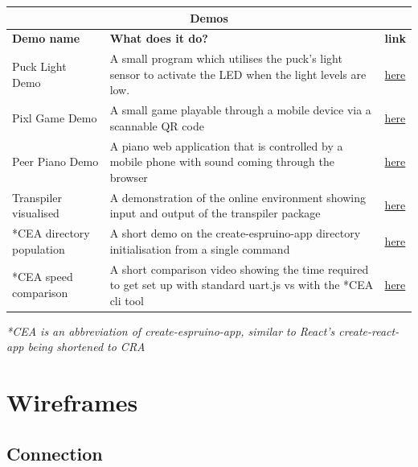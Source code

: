 \documentclass{l4proj}
\begin{document}
\begin{appendices}
\begin{tabular}{|p{4cm}|p{8.25cm}|p{0.75cm}|}
 \hline
 \multicolumn{3}{|c|}{Demos} \\
 \hline
 \textbf{Demo name}  & \textbf{What does it do?} & \textbf{link}\\
 \hline
Puck Light Demo  & A small program which utilises the puck's light sensor to activate the LED when the light levels
are low.& \href{https://demos-mu.vercel.app/demo/light-sensor}{here}\\ \hline
Pixl Game Demo& A small game playable through a mobile device via a scannable QR code&\href{https://demos-mu.vercel.app/demo/pixl-dinosaur-demo}{here}\\ \hline
Peer Piano Demo&A piano web application that is controlled by a mobile phone with sound coming through the browser&\href{https://demos-mu.vercel.app/demo/piano-demo}{here} \\ \hline
Transpiler visualised&A demonstration of the online environment showing input and output of the transpiler package&\href{https://demos-mu.vercel.app/demo/transpiler}{here} \\ \hline
*CEA directory population&A short demo on the create-espruino-app directory initialisation from a single command&\href{https://demos-mu.vercel.app/demo/create-espruino-app}{here} \\ \hline
*CEA speed comparison&A short comparison video showing the time required to get set up with standard uart.js vs with the *CEA cli tool&\href{https://demos-mu.vercel.app/demo/cli-tool-comparison}{here}\\
 \hline
    \end{tabular}

\textit{*CEA is an abbreviation of create-espruino-app, similar to React's create-react-app being shortened to CRA}

\chapter{Wireframes}
\label{appendix:wireframes}

\section{Connection}


\end{appendices}
\end{document}
